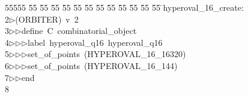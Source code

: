%
%
\begin{tabbing}
55555 \= 55 \= 55 \= 55 \= 55 \= 55 \= 55 \= 55 \= 55 \= 55 \= 55 \= 55 \= 55 \= \>hyperoval\_16\_create:\\[0pt]
2\>$\triangleright$\>(ORBITER)\ v\ 2\ \\[0pt]
3\>$\triangleright$\>$\triangleright$\>define\ C\ combinatorial\_object\ \\[0pt]
4\>$\triangleright$\>$\triangleright$\>$\triangleright$\>label\ hyperoval\_q16\ hyperoval\_q16\ \\[0pt]
5\>$\triangleright$\>$\triangleright$\>$\triangleright$\>set\_of\_points\ (HYPEROVAL\_16\_16320)\ \\[0pt]
6\>$\triangleright$\>$\triangleright$\>$\triangleright$\>set\_of\_points\ (HYPEROVAL\_16\_144)\ \\[0pt]
7\>$\triangleright$\>$\triangleright$\>end\ \\[0pt]
8\>\end{tabbing}
